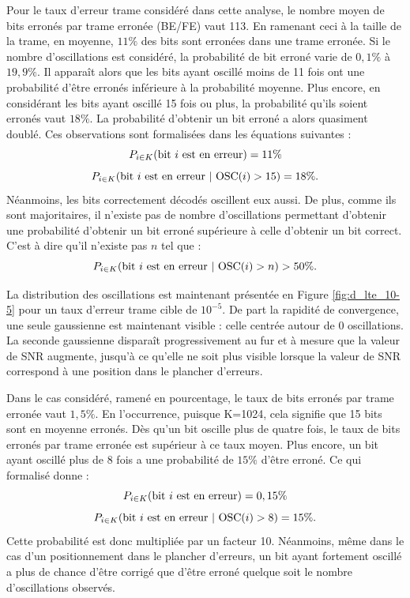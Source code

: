 Pour le taux d'erreur trame considéré dans cette analyse, le nombre moyen de bits erronés par trame erronée (BE/FE) vaut 
113. En ramenant ceci à la taille de la trame, en moyenne, $11\%$ des bits sont erronées dans une trame erronée. 
Si le nombre d'oscillations est considéré, la probabilité de bit erroné varie de $0,1\%$ à $19,9\%$. Il apparaît alors 
que les bits ayant oscillé moins de 11 fois ont une probabilité d'être erronés inférieure à la probabilité moyenne. Plus encore, 
en considérant les bits ayant oscillé 15 fois ou plus, la probabilité qu'ils soient erronés vaut $18\%$. La probabilité 
d'obtenir un bit erroné a alors quasiment doublé. 
Ces observations sont formalisées dans les équations suivantes :
\[P_{i \in K} (\textnormal{bit } i \textnormal{ est en erreur}) = 11 \%\]
\[P_{i \in K} (\textnormal{bit } i \textnormal{ est en erreur}\ |\ \textnormal{OSC}(i) > 15 ) = 18 \%.\]
Néanmoins, les bits correctement décodés oscillent eux aussi. De plus, comme ils sont majoritaires, il n'existe pas de 
nombre d'oscillations permettant d'obtenir une probabilité d'obtenir un bit erroné supérieure à celle d'obtenir un bit
correct. C'est à dire qu'il n'existe pas $n$ tel que : 
\[P_{i \in K} (\textnormal{bit } i \textnormal{ est en erreur}\ |\ \textnormal{OSC}(i) > n ) > 50 \%.\]

La distribution des oscillations est maintenant présentée en Figure \ref{fig:d_lte_10-5} pour un  taux d'erreur trame 
cible de $10^{-5}$. De part la rapidité de convergence, une seule gaussienne est maintenant visible : celle centrée autour 
de 0 oscillations. 
La seconde gaussienne disparaît progressivement au fur et à mesure que la valeur de SNR augmente, jusqu'à ce qu'elle ne 
soit plus visible lorsque la valeur de SNR correspond à une position dans le plancher d'erreurs.

Dans le cas considéré, ramené en pourcentage, le taux de bits erronés par trame erronée vaut $1,5\%$. 
En l’occurrence, puisque K=1024, cela signifie que 15 bits sont en moyenne erronés. Dès qu'un bit oscille plus de quatre fois, 
le taux de bits erronés par trame erronée est supérieur à ce taux moyen. Plus encore, un bit ayant oscillé plus de 8 fois a une probabilité de $15\%$
d'être erroné. Ce qui formalisé donne :
\[P_{i \in K} (\textnormal{bit } i \textnormal{ est en erreur}) = 0,15 \%\]
\[P_{i \in K} (\textnormal{bit } i \textnormal{ est en erreur}\ |\ \textnormal{OSC}(i) > 8 ) = 15 \%.\]
Cette probabilité est donc multipliée par un facteur 10. Néanmoins, même dans le cas d'un positionnement 
dans le plancher d'erreurs, un bit ayant fortement oscillé a plus de chance d'être corrigé que d'être erroné quelque soit le nombre
d'oscillations observés.

